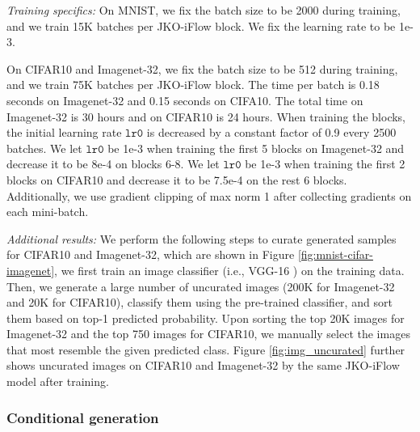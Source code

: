 \documentclass{article}
\theoremstyle{remark}
\theoremstyle{plain}
\newcommand{\JKO}{JKO-iFlow}
\begin{document}
{{\vspace{0.1in}
\noindent \textit{Training specifics:} 
On MNIST, we fix the batch size to be 2000 during training, and we train 15K batches per \JKO{} block. We fix the learning rate to be 1e-3.

% 
On CIFAR10 and Imagenet-32, we fix the batch size to be 512 during training, and we train 75K batches per \JKO{} block. The time per batch is 0.18 seconds on Imagenet-32 and 0.15 seconds on CIFA10. The total time on Imagenet-32 is 30 hours and on CIFAR10 is 24 hours.
% 
When training the blocks, the initial learning rate $\texttt{lr0}$ is decreased by a constant factor of 0.9 every 2500 batches. We let $\texttt{lr0}$ be 1e-3 when training the first 5 blocks on Imagenet-32 and decrease it to be 8e-4 on blocks 6-8. We let $\texttt{lr0}$ be 1e-3 when training the first 2 blocks on CIFAR10 and decrease it to be 7.5e-4 on the rest 6 blocks. Additionally, we use gradient clipping of max norm 1 after collecting gradients on each mini-batch.


\vspace{0.1in}
\noindent \textit{Additional results:} We perform the following steps to curate generated samples for CIFAR10 and Imagenet-32, which are shown in Figure \ref{fig:mnist-cifar-imagenet}, 
%
we first train an image classifier (i.e., VGG-16 \citep{Simonyan15}) on the training data.
%
Then, we generate a large number of uncurated images (200K for Imagenet-32 and 20K for CIFAR10), classify them using the pre-trained classifier, and sort them based on top-1 predicted probability. 
%
Upon sorting the top 20K images for Imagenet-32 and the top 750 images for CIFAR10, we manually select the images that most resemble the given predicted class. 
% 
Figure \ref{fig:img_uncurated} further shows uncurated images on CIFAR10 and Imagenet-32 by the same \JKO{} model after training. 




}




\subsubsection{Conditional generation}\label{append_cond_gen}

}
\end{document}
